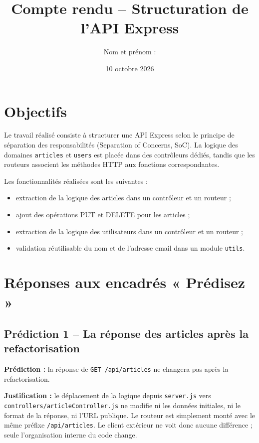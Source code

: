 \documentclass[12pt,a4paper]{article}
\title{Compte rendu -- Structuration de l'API Express}
\author{Nom et prénom : \rule{7cm}{0.4pt}}
\date{10 octobre 2026}
\begin{document}
\maketitle
\tableofcontents
\newpage

\section{Objectifs}

Le travail réalisé consiste à structurer une API Express selon le principe de séparation des
responsabilités (Separation of Concerns, SoC). La logique des domaines \texttt{articles} et
\texttt{users} est placée dans des contrôleurs dédiés, tandis que les routeurs associent les
méthodes HTTP aux fonctions correspondantes.

Les fonctionnalités réalisées sont les suivantes :
\begin{itemize}
    \item extraction de la logique des articles dans un contrôleur et un routeur ;
    \item ajout des opérations PUT et DELETE pour les articles ;
    \item extraction de la logique des utilisateurs dans un contrôleur et un routeur ;
    \item validation réutilisable du nom et de l'adresse email dans un module \texttt{utils}.
\end{itemize}

\section{Réponses aux encadrés « Prédisez »}

\subsection{Prédiction 1 -- La réponse des articles après la refactorisation}

\textbf{Prédiction :} la réponse de \texttt{GET /api/articles} ne changera pas après la
refactorisation.

\textbf{Justification :} le déplacement de la logique depuis \texttt{server.js} vers
\texttt{controllers/articleController.js} ne modifie ni les données initiales, ni le format de
la réponse, ni l'URL publique. Le routeur est simplement monté avec le même préfixe
\texttt{/api/articles}. Le client extérieur ne voit donc aucune différence ; seule
l'organisation interne du code change.
\end{document}
